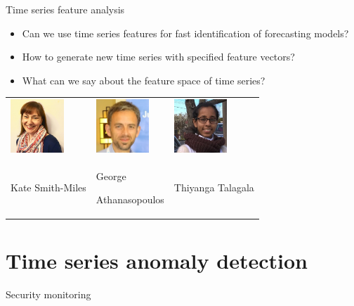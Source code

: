 \documentclass[14pt]{beamer}
\begin{document}
\begin{frame}{Time series feature analysis}

\fontsize{14}{15}\sf

\begin{itemize}
\item
  Can we use time series features for fast identification of forecasting
  models?
\item
  How to generate new time series with specified feature vectors?
\item
  What can we say about the feature space of time series?
\end{itemize}

\pause\vspace*{0.6cm}

\begin{block}{}
\fontsize{11}{11}\sf
\centering\begin{tabular}{p{3cm}p{3cm}p{3cm}}
\includegraphics[height=2cm]{figs/kate} &
\includegraphics[height=2cm]{figs/george} &
\includegraphics[height=2cm]{figs/thiyanga} \\
Kate Smith-Miles & George\par Athanasopoulos & Thiyanga Talagala
\end{tabular}
\end{block}

\end{frame}

\section{Time series anomaly detection}

\begin{frame}{Security monitoring}


\end{frame}
\end{document}
